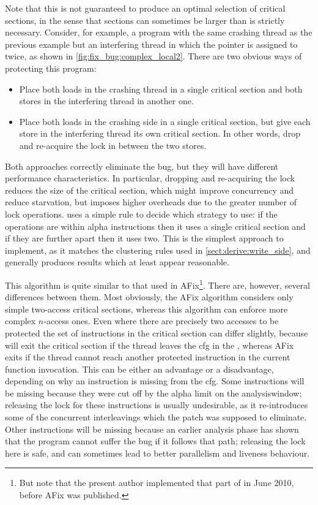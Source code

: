 Note that this is not guaranteed to produce an optimal selection of
critical sections, in the sense that sections can sometimes be larger
than is strictly necessary.  Consider, for example, a program with the
same crashing thread as the previous example but an interfering thread
in which the pointer is assigned to twice, as shown in
\autoref{fig:fix_bug:complex_local2}.  There are two obvious ways of
protecting this program:

\begin{itemize}
\item
  Place both loads in the crashing thread in a single critical section and
  both stores in the interfering thread in another one.
\item
  Place both loads in the crashing side in a single critical section,
  but give each store in the interfering thread its own critical
  section.  In other words, drop and re-acquire the lock in between
  the two stores.
\end{itemize}

Both approaches correctly eliminate the bug, but they will have
different performance characteristics.  In particular, dropping and
re-acquiring the lock reduces the size of the critical section, which
might improve concurrency and reduce starvation, but imposes higher
overheads due to the greater number of lock operations.  {\Technique}
uses a simple rule to decide which strategy to use: if the operations
are within \gls{alpha} instructions then it uses a single critical
section and if they are further apart then it uses two.  This is the
simplest approach to implement, as it matches the clustering rules
used in \autoref{sect:derive:write_side}, and generally produces
results which at least appear reasonable.

\label{sect:fixing:rw_afix}
This algorithm is quite similar to that used in
AFix\cite{Jin2011}\footnote{But note that the present author
  implemented that part of {\implementation} in June 2010, before AFix
  was published.}.  There are, however, several differences between
them.  Most obviously, the AFix algorithm considers only simple
two-access critical sections, whereas this algorithm can enforce more
complex $n$-access ones.  Even where there are precisely two accesses
to be protected the set of instructions in the critical section can
differ slightly, because {\technique} will exit the critical section
if the thread leaves the \gls{cfg} in the {\StateMachine}, whereas
AFix exits if the thread cannot reach another protected instruction in
the current function invocation.  This can be either an advantage or a
disadvantage, depending on why an instruction is missing from the
{\StateMachine} \gls{cfg}.  Some instructions will be missing because
they were cut off by the \gls{alpha} limit on the
\gls{analysiswindow}; releasing the lock for these instructions is
usually undesirable, as it re-introduces some of the concurrent
interleavings which the patch was supposed to eliminate.  Other
instructions will be missing because an earlier analysis phase has
shown that the program cannot suffer the bug if it follows that path;
releasing the lock here is safe, and can sometimes lead to better
parallelism and liveness behaviour.

